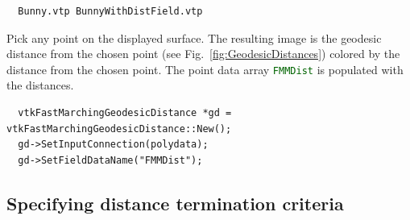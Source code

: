 \documentclass{InsightArticle}
\def\code#1{\small\textcolor{darkgreen}{\texttt{#1}}}
\begin{document}
\begin{lstlisting}
  Bunny.vtp BunnyWithDistField.vtp
\end{lstlisting}

Pick any point on the displayed surface. The resulting image is the geodesic distance from the chosen point (see Fig.~\ref{fig:GeodesicDistances}) colored by the distance from the chosen point. The point data array \code{FMMDist} is populated with the distances.

\lstset{language=[ANSI]C++, floatplacement=!htb}
\begin{lstlisting}
  vtkFastMarchingGeodesicDistance *gd = vtkFastMarchingGeodesicDistance::New();
  gd->SetInputConnection(polydata);
  gd->SetFieldDataName("FMMDist");
\end{lstlisting}


\subsection{Specifying distance termination criteria}
\end{document}
